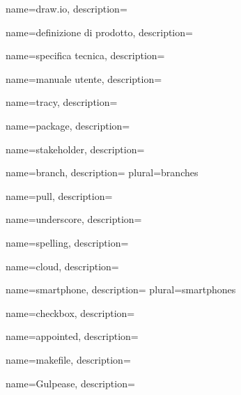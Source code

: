  {
	name=draw.io,
	description={\TODO{}}
}

 {
	name=definizione di prodotto,
	description={\TODO{}}
}

 {
	name=specifica tecnica,
	description={\TODO{}}
}

 {
	name=manuale utente,
	description={\TODO{}}
}

 {
	name=tracy,
	description={\TODO{}}
}

 {
	name=package,
	description={\TODO{}}
}

 {
	name=stakeholder,
	description={\TODO{}}
}

 {
	name=branch,
	description={\TODO{}}
	plural=branches
}

 {
	name=pull,
	description={\TODO{}}
}

 {
	name=underscore,
	description={\TODO{}}
}

 {
	name=spelling,
	description={\TODO{}}
}

 {
	name=cloud,
	description={\TODO{}}
}

 {
	name=smartphone,
	description={\TODO{}}
	plural=smartphones
}

 {
	name=checkbox,
	description={\TODO{}}
}

 {
	name=appointed,
	description={\TODO{}}
}

 {
	name=makefile,
	description={\TODO{}}
}

 {
	name=Gulpease,
	description={\TODO{}}
}
